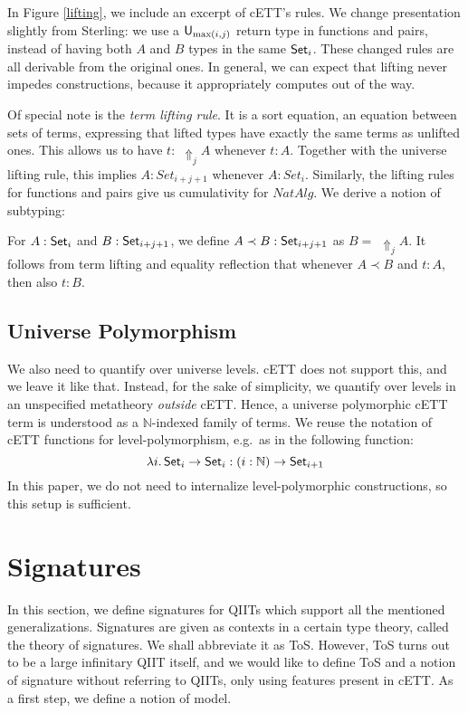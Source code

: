 \documentclass{llncs}
\newcommand{\Lift}{\Uparrow}
\begin{document}
In Figure \ref{lifting}, we include an excerpt of cETT's rules. We change
presentation slightly from Sterling: we use a $\mathsf{U}_{\max(i,j)}$ return type in
functions and pairs, instead of having both $A$ and $B$ types in the same
$\mathsf{Set}_i$. These changed rules are all derivable from the original ones. In
general, we can expect that lifting never impedes constructions, because it
appropriately computes out of the way.

Of special note is the \emph{term lifting rule}. It is a sort equation, an
equation between sets of terms, expressing that lifted types have exactly the
same terms as unlifted ones. This allows us to have $t :\,\,\Lift_j A$ whenever $t
: A$. Together with the universe lifting rule, this implies $A : Set_{i+j+1}$
whenever $A : Set_i$. Similarly, the lifting rules for functions and pairs give
us cumulativity for $NatAlg$. We derive a notion of subtyping:

\begin{nidefinition}
  For $A : \mathsf{Set}_i$ and $B : \mathsf{Set}_{i+j+1}$, we define $A \prec B : \mathsf{Set}_{i+j+1}$
  as $B =\,\,\Lift_j A$.  It follows from term lifting and equality reflection
  that whenever $A \prec B$ and $t : A$, then also $t : B$.
\end{nidefinition}

\subsection{Universe Polymorphism}
\label{sec:universe_polymorphism}

We also need to quantify over universe levels. cETT does not support this, and
we leave it like that. Instead, for the sake of simplicity, we quantify over
levels in an unspecified metatheory \emph{outside} cETT. Hence, a universe
polymorphic cETT term is understood as a $\mathbb{N}$-indexed family of
terms. We reuse the notation of cETT functions for level-polymorphism, e.g.\
as in the following function:
\[
\lambda i.\,\mathsf{Set}_i\rightarrow\mathsf{Set}_i : (i : \mathbb{N})\rightarrow \mathsf{Set}_{i+1}
\]
In this paper, we do not need to internalize level-polymorphic constructions,
so this setup is sufficient.

\section{Signatures}
\label{sec:tos}

In this section, we define signatures for QIITs which support all the mentioned
generalizations. Signatures are given as contexts in a certain type theory,
called the theory of signatures. We shall abbreviate it as ToS. However, ToS
turns out to be a large infinitary QIIT itself, and we would like to define ToS
and a notion of signature without referring to QIITs, only using features
present in cETT. As a first step, we define a notion of model.
\end{document}
